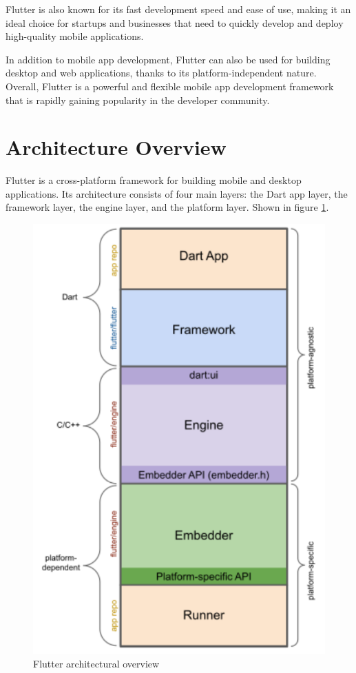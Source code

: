 \documentclass[conference]{IEEEtran}
\begin{document}
Flutter is also known for its fast development speed and ease of use, making it an ideal choice for startups and businesses that need to quickly develop and deploy high-quality mobile applications.

In addition to mobile app development, Flutter can also be used for building desktop and web applications, thanks to its platform-independent nature. Overall, Flutter is a powerful and flexible mobile app development framework that is rapidly gaining popularity in the developer community.

\section{Architecture Overview}

Flutter is a cross-platform framework for building mobile and desktop applications. Its architecture consists of four main layers: the Dart app layer, the framework layer, the engine layer, and the platform layer. Shown in figure \ref{fig:flutter_tech_stack}.

\begin{figure}[ht]
	\centerline{\includegraphics[width=\linewidth]{figures/app-anatomy}}
	\caption{Flutter architectural overview \cite{b1.1}}
	\label{fig:flutter_tech_stack}
\end{figure}
\end{document}
